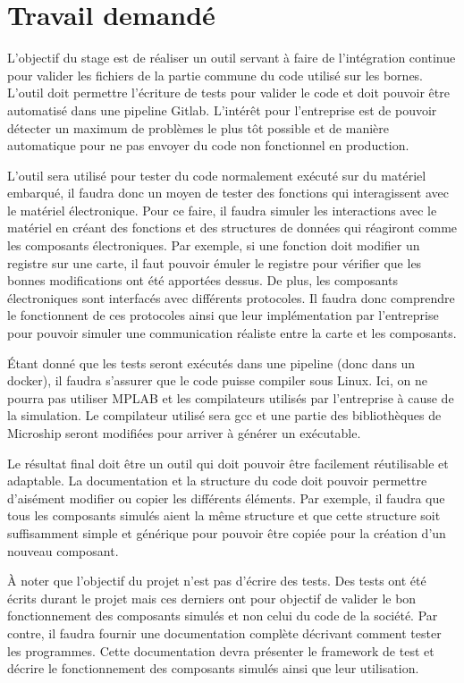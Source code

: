 \documentclass[a4paper]{article}
\begin{document}
\section{Travail demandé}%

L'objectif du stage est de réaliser un outil servant à faire de l'intégration
continue pour valider les fichiers de la partie commune du code utilisé sur les
bornes. L'outil doit permettre l'écriture de tests pour valider le code et doit
pouvoir être automatisé dans une pipeline Gitlab. L'intérêt pour l'entreprise
est de pouvoir détecter un maximum de problèmes le plus tôt possible et de
manière automatique pour ne pas envoyer du code non fonctionnel en production.

L'outil sera utilisé pour tester du code normalement exécuté sur du matériel
embarqué, il faudra donc un moyen de tester des fonctions qui interagissent avec
le matériel électronique. Pour ce faire, il faudra simuler les interactions avec
le matériel en créant des fonctions et des structures de données qui réagiront
comme les composants électroniques. Par exemple, si une fonction doit modifier
un registre sur une carte, il faut pouvoir émuler le registre pour vérifier que
les bonnes modifications ont été apportées dessus. De plus, les composants
électroniques sont interfacés avec différents protocoles. Il faudra donc
comprendre le fonctionnent de ces protocoles ainsi que leur implémentation par
l'entreprise pour pouvoir simuler une communication réaliste entre la carte et
les composants.

Étant donné que les tests seront exécutés dans une pipeline (donc dans un
docker), il faudra s'assurer que le code puisse compiler sous Linux. Ici, on ne
pourra pas utiliser MPLAB et les compilateurs utilisés par l'entreprise à cause
de la simulation. Le compilateur utilisé sera gcc et une partie des
bibliothèques de Microship seront modifiées pour arriver à générer un
exécutable.

Le résultat final doit être un outil qui doit pouvoir être facilement
réutilisable et adaptable. La documentation et la structure du code doit pouvoir
permettre d'aisément modifier ou copier les différents éléments. Par exemple, il
faudra que tous les composants simulés aient la même structure et que cette
structure soit suffisamment simple et générique pour pouvoir être copiée pour la
création d'un nouveau composant.

À noter que l'objectif du projet n'est pas d'écrire des tests.  Des tests ont
été écrits durant le projet mais ces derniers ont pour objectif de valider le
bon fonctionnement des composants simulés et non celui du code de la société.
Par contre, il faudra fournir une documentation complète décrivant comment
tester les programmes. Cette documentation devra présenter le framework de test
et décrire le fonctionnement des composants simulés ainsi que leur utilisation.
\end{document}
